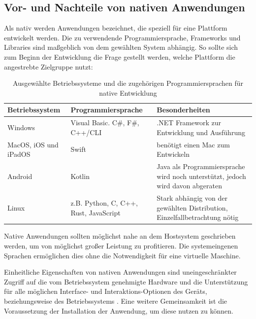 \documentclass[a4paper]{scrartcl}
\begin{document}
\newpage

\subsection{Vor- und Nachteile von nativen Anwendungen}

Als nativ werden Anwendungen bezeichnet, die speziell für eine Plattform entwickelt werden. Die zu verwendende Programmiersprache, Frameworks und Libraries sind maßgeblich von dem gewählten System abhängig. So sollte sich zum Beginn der Entwicklung die Frage gestellt werden, welche Plattform die angestrebte Zielgruppe nutzt:

\begin{table}[H]
 	\caption{Ausgewählte Betriebssysteme und die zugehörigen Programmiersprachen für native Entwicklung}
 	\begin{center}
 		\begin{tabularx}{\linewidth}{| Y | Y | Y |}
 			\hline
 			\textbf{Betriebssystem} & \textbf{Programmiersprache} & \textbf{Besonderheiten} \\
 			\hline \hline
 			Windows & Visual Basic. C\#, F\#, C++/CLI & .NET Framework zur Entwicklung und Ausführung \autocite{.NET_Microsoft} \\
 			\hline
 			MacOS, iOS und iPadOS & Swift & benötigt einen Mac zum Entwickeln \autocite{Swift_Apple} \\
 			\hline
 			Android & Kotlin & Java als Programmiersprache wird noch unterstützt, jedoch wird davon abgeraten \autocite{Kotlin_Android} \\
 			\hline
 			Linux & z.B. Python, C, C++, Rust, JavaScript & Stark abhängig von der gewählten Distribution, Einzelfallbetrachtung nötig \autocite{Linux_App} \\
 			\hline
 		\end{tabularx}
 	\end{center}
 	\justifying
	\small	
 	Native Anwendungen sollten möglichst nahe an dem Hostsystem geschrieben werden, um von möglichst großer Leistung zu profitieren. Die systemeingenen Sprachen ermöglichen dies ohne die Notwendigkeit für eine virtuelle Maschine.
 \end{table}
 
 Einheitliche Eigenschaften von nativen Anwendungen sind uneingeschränkter Zugriff auf die vom Betriebssystem genehmigte Hardware und die Unterstützung für alle möglichen Interface- und Interaktions-Optionen des Geräts, beziehungsweise des Betriebssystems \autocite[28]{Jobe}. Eine weitere Gemeinsamkeit ist die Voraussetzung der Installation der Anwendung, um diese nutzen zu können. \\
 
\end{document}
